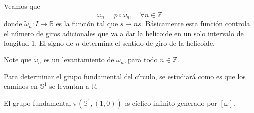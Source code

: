 \documentclass{article}
\newcounter{it}
\theoremstyle{largebreak}
\newcommand\cf[3]{\ensuremath{#1:#2\rightarrow#3}}
\begin{document}
    \begin{obs}
        Veamos que
        \begin{equation*}
            \omega_n=p\circ\widetilde{\omega}_n,\quad\forall n\in\mathbb{Z}
        \end{equation*}
        donde $\cf{\widetilde{\omega}_n}{I}{\mathbb{R}}$ es la función tal que $s\mapsto ns$. Básicamente esta función controla el número de giros adicionales que va a dar la helicoide en un solo intervalo de longitud 1. El signo de $n$ determina el sentido de giro de la helicoide.

        Note que $\widetilde{\omega}_n$ es un levantamiento de $\omega_n$, para todo $n\in\mathbb{Z}$.
    \end{obs}
    
    Para determinar el grupo fundamental del círculo, se estudiará como es que los caminos en $\mathbb{S}^1$ se levantan a $\mathbb{R}$.

    \begin{theor}
        El grupo fundamental $\pi(\mathbb{S}^1,(1,0))$ es cíclico infinito generado por $[\omega]$.
    \end{theor}
\end{document}
